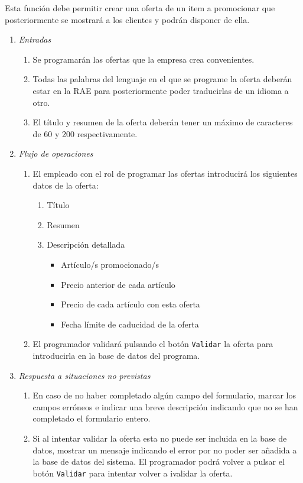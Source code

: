 	Esta función debe permitir crear una oferta de un item a promocionar que posteriormente se mostrará a los clientes y podrán disponer de ella.
	
\begin{enumerate}
	\item \textit{Entradas}
	\begin{enumerate}
		\item Se programarán las ofertas que la empresa crea convenientes.
		\item Todas las palabras del lenguaje en el que se programe la oferta deberán estar en la \gls{RAE} para posteriormente poder traducirlas de un idioma a otro.
		\item El título y resumen de la oferta deberán tener un máximo de caracteres de 60 y 200 respectivamente.
	\end{enumerate}
	\item \textit{Flujo de operaciones}
	\begin{enumerate}
		\item El empleado con el rol de programar las ofertas introducirá los siguientes datos de la oferta:
		
			\begin{enumerate}
				\item Título
				\item Resumen
				\item Descripción detallada
				
					\begin{itemize}
						\item Artículo/s promocionado/s
						\item Precio anterior de cada artículo
						\item Precio de cada artículo con esta oferta
						\item Fecha límite de caducidad de la oferta
					\end{itemize}
				
			\end{enumerate}
		\item El programador validará pulsando el botón \verb|Validar| la oferta para introducirla en la base de datos del programa.
	\end{enumerate}
	\item \textit{Respuesta a situaciones no previstas}
	\begin{enumerate}
		\item En caso de no haber completado algún campo del formulario, marcar los campos erróneos e indicar una breve descripción indicando que no se han completado el formulario entero.
		\item Si al intentar validar la oferta esta no puede ser incluida en la base de datos, mostrar un mensaje indicando el error por no poder ser añadida a la base de datos del sistema. El programador podrá volver a pulsar el botón \verb|Validar| para intentar volver a ivalidar la oferta.
	\end{enumerate}
\end{enumerate}
